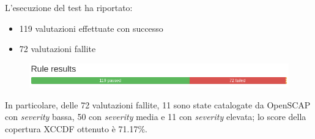 \documentclass[../main.tex]{subfiles}
\begin{document}
L'esecuzione del test ha riportato:
\begin{itemize}
    \item 119 valutazioni effettuate con successo
    \item 72 valutazioni fallite
\end{itemize}
\begin{figure}[H]
    \centering
    \includegraphics[width=15cm]{immagini/test_oscap_1.png}
\end{figure}

In particolare, delle 72 valutazioni fallite, 11 sono state catalogate da OpenSCAP con \textit{severity} bassa, 50 con \textit{severity} media e 11 con \textit{severity} elevata; lo score della copertura XCCDF ottenuto è 71.17\%.
\vfill\newpage
\end{document}
